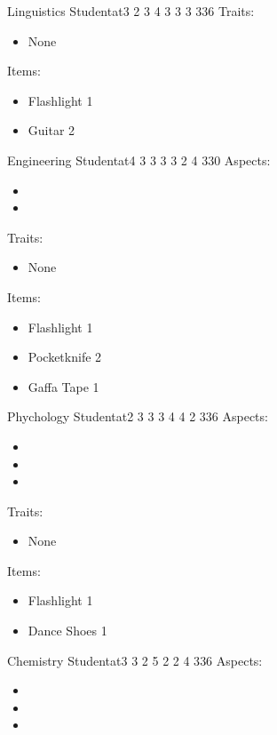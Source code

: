 \documentclass[11pt]{article}
\begin{document}
{\begin{npc}{Linguistics Student}{at}{3 2 3 4 3 3 3 3}{36}
Traits:
\begin{itemize}
\item None
\end{itemize}

Items:
\begin{itemize}
\item Flashlight 1
\item Guitar 2
\end{itemize}
\end{npc}

\begin{npc}{Engineering Student}{at}{4 3 3 3 3 2 4 3}{30}
Aspects:
\begin{itemize}
\item {}
\item {}
\end{itemize}
\columnbreak

Traits:
\begin{itemize}
\item None
\end{itemize}

Items:
\begin{itemize}
\item Flashlight 1
\item Pocketknife 2
\item Gaffa Tape 1
\end{itemize}
\end{npc}

\begin{npc}{Phychology Student}{at}{2 3 3 3 4 4 2 3}{36}
Aspects:
\begin{itemize}
\item {}
\item {}
\item {}
\end{itemize}
\columnbreak

Traits:
\begin{itemize}
\item None
\end{itemize}

Items:
\begin{itemize}
\item Flashlight 1
\item Dance Shoes 1
\end{itemize}
\end{npc}

\begin{npc}{Chemistry Student}{at}{3 3 2 5 2 2 4 3}{36}
Aspects:
\begin{itemize}
\item {}
\item {}
\item {}
\end{itemize}
\columnbreak


\end{npc}}
\end{document}
